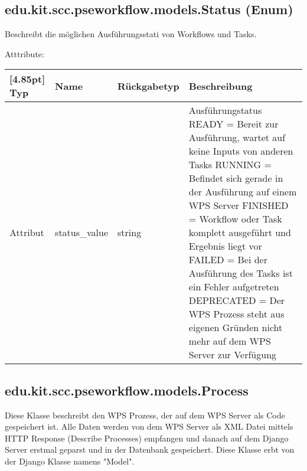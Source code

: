 		\subsection{edu.kit.scc.pseworkflow.models.Status (Enum)}	
			Beschreibt die möglichen Ausführungsstati von Workflows und Tasks. \newline
			
			Atttribute:
			\begin{center}
				\setlength\tabcolsep{5pt}
				\renewcommand{\arraystretch}{1.5}
				
				\begin{tabularx}{\textwidth}{|l|l|l|X|}
					\hline
					\rowcolor[gray]{0.75}[4.85pt]
					Typ & Name & Rückgabetyp & Beschreibung \\ \hline 
	           		Attribut & status\_value & string & Ausführungstatus\newline
	           		READY = Bereit zur Ausführung, wartet auf keine Inputs von anderen Tasks \newline
	           		RUNNING = Befindet sich gerade in der Ausführung auf einem WPS Server \newline 
	           		FINISHED = Workflow oder Task komplett ausgeführt und Ergebnis liegt vor \newline
	           		FAILED = Bei der Ausführung des Tasks ist ein Fehler aufgetreten \newline
	           		DEPRECATED = Der WPS Prozess steht aus eigenen Gründen nicht mehr auf dem WPS Server zur Verfügung \\
	           		\hline
				\end{tabularx}
			\end{center}
		\subsection{edu.kit.scc.pseworkflow.models.Process}
			Diese Klasse beschreibt den WPS Prozess, der auf dem WPS Server als Code gespeichert ist. Alle Daten werden von dem WPS Server als XML Datei mittels HTTP Response (Describe Processes) empfangen und danach auf dem Django Server erstmal geparst und in der Datenbank gespeichert. \newline
			Diese Klasse erbt von der Django Klasse namens "Model".
			
